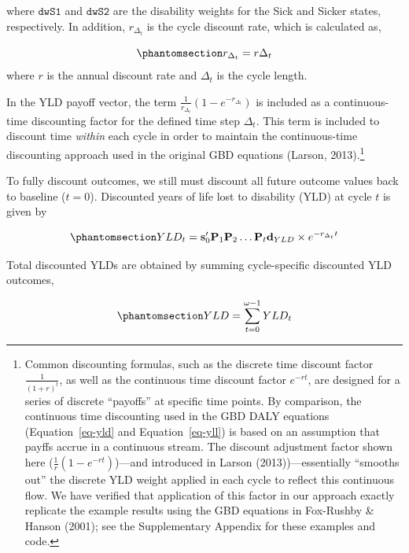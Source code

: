\documentclass[
]{agujournal2019}
\begin{document}
where \(\texttt{dwS1}\) and \(\texttt{dwS2}\) are the disability weights
for the Sick and Sicker states, respectively. In addition,
\(r_{\Delta_t}\) is the cycle discount rate, which is calculated as,

\begin{equation}\phantomsection\label{eq-cycledisc}{
r_{\Delta_t} = r \Delta_t
}\end{equation} where \(r\) is the annual discount rate and \(\Delta_t\)
is the cycle length.

In the YLD payoff vector, the term
\(\frac{1}{r_{\Delta_t}}(1-e^{-r_{\Delta_t}})\) is included as a
continuous-time discounting factor for the defined time step
\(\Delta_t\). This term is included to discount time \emph{within} each
cycle in order to maintain the continuous-time discounting approach used
in the original GBD equations (Larson, 2013).\footnote{Common
  discounting formulas, such as the discrete time discount factor
  \(\frac{1}{(1+r)^t}\), as well as the continuous time discount factor
  \(e^{-rt}\), are designed for a series of discrete ``payoffs'' at
  specific time points. By comparison, the continuous time discounting
  used in the GBD DALY equations (Equation~\ref{eq-yld} and
  Equation~\ref{eq-yll}) is based on an assumption that payffs accrue in
  a continuous stream. The discount adjustment factor shown here
  (\(\frac{1}{r}(1-e^{-rt})\))---and introduced in Larson
  (2013))---essentially ``smooths out'' the discrete YLD weight applied
  in each cycle to reflect this continuous flow. We have verified that
  application of this factor in our approach exactly replicate the
  example results using the GBD equations in Fox-Rushby \& Hanson
  (2001); see the Supplementary Appendix for these examples and code.}

To fully discount outcomes, we still must discount all future outcome
values back to baseline (\(t=0\)). Discounted years of life lost to
disability (YLD) at cycle \(t\) is given by

\begin{equation}\phantomsection\label{eq-yldt}{
YLD_t=\mathbf{s}'_0 \mathbf{P}_1\mathbf{P}_2\dots\mathbf{P}_t \mathbf{d}_{YLD}  \times{e^{-r_{\Delta_t} t}}
}\end{equation}

Total discounted YLDs are obtained by summing cycle-specific discounted
YLD outcomes,

\begin{equation}\phantomsection\label{eq-yldcum}{
YLD=\sum_{t=0}^{\omega-1} YLD_t
}\end{equation}
\end{document}
